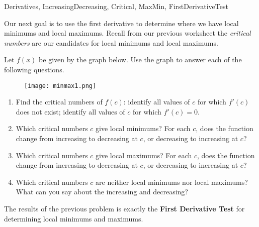 \begin{tagblock}{Derivatives, IncreasingDecreasing, Critical, MaxMin, FirstDerivativeTest}
\begin{question}

Our next goal is to use the first derivative to determine where we have local minimums and local maximums.  Recall from our previous worksheet the \emph{critical numbers} are our candidates for local minimums and local maximums.  

 Let $f(x)$ be given by the graph below.  Use the graph to answer each of the following questions.
\begin{figure}[h]
\centering
\texttt{[image: minmax1.png]} 
\end{figure}

\begin{enumerate}

\item Find the critical numbers of $f(c)$: identify all values of $c$ for which $f'(c)$ does not exist; identify all values of $c$ for which $f'(c) = 0$.

\vspace{.4in}



\item Which critical numbers $c$ give local minimums? For each $c$, does the function change from increasing to decreasing at $c$, or decreasing to increasing at $c$?

\vspace{.4in}



\item Which critical numbers $c$ give local maximums? For each $c$, does the function change from increasing to decreasing at $c$, or decreasing to increasing at $c$?

\vspace{.4in}

\item Which critical numbers $c$ are neither local minimums nor local maximums?  What can you say about the increasing and decreasing?  







\end{enumerate}


\bigskip

The results of the previous problem is exactly the \textbf{First Derivative Test} for determining local minimums and maximums.


\end{question}
\end{tagblock}
